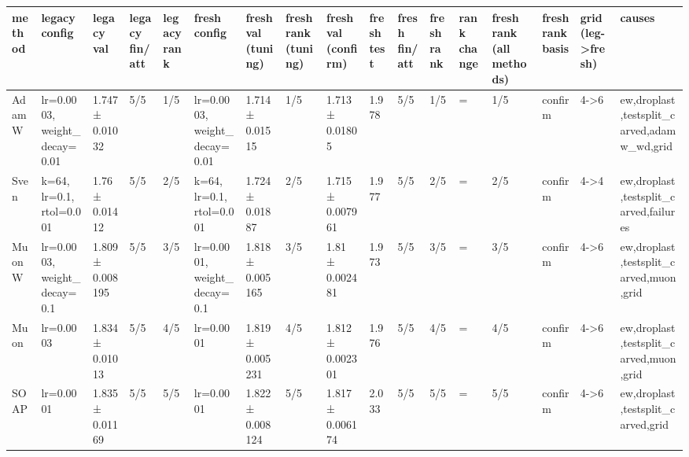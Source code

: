 \begin{tabular}{lllllllllllllllll}
\toprule
method & legacy config & legacy val & legacy fin/att & legacy rank & fresh config & fresh val (tuning) & fresh rank (tuning) & fresh val (confirm) & fresh test & fresh fin/att & fresh rank & rank change & fresh rank (all methods) & fresh rank basis & grid (leg->fresh) & causes \\
\midrule
AdamW & lr=0.0003, weight\_decay=0.01 & 1.747 ± 0.01032 & 5/5 & 1/5 & lr=0.0003, weight\_decay=0.01 & 1.714 ± 0.01515 & 1/5 & 1.713 ± 0.01805 & 1.978 & 5/5 & 1/5 & = & 1/5 & confirm & 4->6 & ew,droplast,testsplit\_carved,adamw\_wd,grid \\
Sven & k=64, lr=0.1, rtol=0.001 & 1.76 ± 0.01412 & 5/5 & 2/5 & k=64, lr=0.1, rtol=0.001 & 1.724 ± 0.01887 & 2/5 & 1.715 ± 0.007961 & 1.977 & 5/5 & 2/5 & = & 2/5 & confirm & 4->4 & ew,droplast,testsplit\_carved,failures \\
MuonW & lr=0.0003, weight\_decay=0.1 & 1.809 ± 0.008195 & 5/5 & 3/5 & lr=0.0001, weight\_decay=0.1 & 1.818 ± 0.005165 & 3/5 & 1.81 ± 0.002481 & 1.973 & 5/5 & 3/5 & = & 3/5 & confirm & 4->6 & ew,droplast,testsplit\_carved,muon,grid \\
Muon & lr=0.0003 & 1.834 ± 0.01013 & 5/5 & 4/5 & lr=0.0001 & 1.819 ± 0.005231 & 4/5 & 1.812 ± 0.002301 & 1.976 & 5/5 & 4/5 & = & 4/5 & confirm & 4->6 & ew,droplast,testsplit\_carved,muon,grid \\
SOAP & lr=0.0001 & 1.835 ± 0.01169 & 5/5 & 5/5 & lr=0.0001 & 1.822 ± 0.008124 & 5/5 & 1.817 ± 0.006174 & 2.033 & 5/5 & 5/5 & = & 5/5 & confirm & 4->6 & ew,droplast,testsplit\_carved,grid \\
\bottomrule
\end{tabular}
